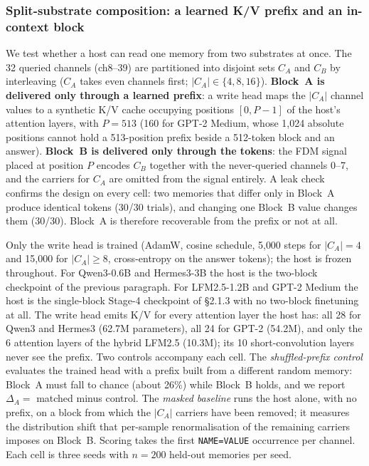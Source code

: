 
\subsubsection{Split-substrate composition: a learned K/V prefix and an in-context block}
\label{sec:method_split}

We test whether a host can read one memory from two substrates at once. The 32 queried channels
(ch8--39) are partitioned into disjoint sets $C_A$ and $C_B$ by interleaving ($C_A$ takes even channels
first; $|C_A| \in \{4, 8, 16\}$). \textbf{Block~A is delivered only through a learned prefix}: a write head
maps the $|C_A|$ channel values to a synthetic K/V cache occupying positions $[0, P{-}1]$ of the host's
attention layers, with $P = 513$ (160 for GPT-2 Medium, whose 1{,}024 absolute positions cannot hold a
513-position prefix beside a 512-token block and an answer). \textbf{Block~B is delivered only through the
tokens}: the FDM signal placed at position $P$ encodes $C_B$ together with the never-queried channels
0--7, and the carriers for $C_A$ are omitted from the signal entirely. A leak check confirms the design on
every cell: two memories that differ only in Block~A produce identical tokens (30/30 trials), and changing
one Block~B value changes them (30/30). Block~A is therefore recoverable from the prefix or not at all.

Only the write head is trained (AdamW, cosine schedule, 5{,}000 steps for $|C_A|{=}4$ and 15{,}000 for
$|C_A| \ge 8$, cross-entropy on the answer tokens); the host is frozen throughout. For Qwen3-0.6B and
Hermes3-3B the host is the two-block checkpoint of the previous paragraph. For LFM2.5-1.2B and GPT-2
Medium the host is the single-block Stage-4 checkpoint of \S2.1.3 with no two-block finetuning at all. The
write head emits K/V for every attention layer the host has: all 28 for Qwen3 and Hermes3 (62.7M
parameters), all 24 for GPT-2 (54.2M), and only the 6 attention layers of the hybrid LFM2.5 (10.3M); its
10 short-convolution layers never see the prefix. Two controls accompany each cell. The
\emph{shuffled-prefix control} evaluates the trained head with a prefix built from a different random memory:
Block~A must fall to chance (about 26\%) while Block~B holds, and we report $\Delta_A = $ matched minus
control. The \emph{masked baseline} runs the host alone, with no prefix, on a block from which the $|C_A|$
carriers have been removed; it measures the distribution shift that per-sample renormalisation of the
remaining carriers imposes on Block~B. Scoring takes the first \texttt{NAME=VALUE} occurrence per channel.
Each cell is three seeds with $n{=}200$ held-out memories per seed.

